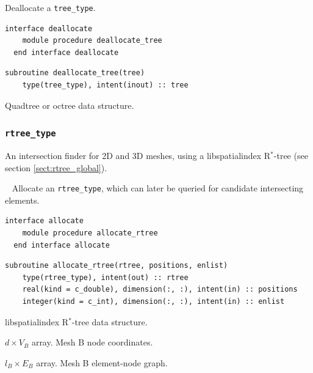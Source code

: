\documentclass{article}
\begin{document}
\noindent Deallocate a \verb+tree_type+.
  
\begin{lstlisting}[language=FORTRAN]
  interface deallocate
    module procedure deallocate_tree
  end interface deallocate
\end{lstlisting}
  
\begin{lstlisting}[language=FORTRAN]  
  subroutine deallocate_tree(tree)
    type(tree_type), intent(inout) :: tree
\end{lstlisting}

\begin{description}[font=\ttfamily\bfseries,leftmargin=2.2\parindent,labelindent=1.7\parindent,noitemsep]
  \item[tree] Quadtree or octree data structure.
\end{description}

\subsubsection{\texttt{rtree\_type}}\label{sect:rtree_query}

An intersection finder for 2D and 3D meshes, using a libspatialindex
R${}^*$-tree (see section \ref{sect:rtree_global}).

~\newline
Allocate an \verb+rtree_type+, which can later be queried for candidate
intersecting elements.

\begin{lstlisting}[language=FORTRAN]
  interface allocate
    module procedure allocate_rtree
  end interface allocate
\end{lstlisting}
  
\begin{lstlisting}[language=FORTRAN]  
  subroutine allocate_rtree(rtree, positions, enlist)
    type(rtree_type), intent(out) :: rtree
    real(kind = c_double), dimension(:, :), intent(in) :: positions
    integer(kind = c_int), dimension(:, :), intent(in) :: enlist
\end{lstlisting}

\begin{description}[font=\ttfamily\bfseries,leftmargin=2.2\parindent,labelindent=1.7\parindent,noitemsep]
  \item[rtree] libspatialindex R${}^*$-tree data structure.
  \item[positions] $d \times V_B$ array. Mesh B node coordinates.
  \item[enlist] $l_B \times E_B$ array. Mesh B element-node graph.
\end{description}
\end{document}
